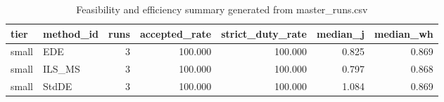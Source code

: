 \begin{table}[!t]
\centering
\caption{Feasibility and efficiency summary generated from master_runs.csv}
\label{tab:feasibility_summary_generated}
\begin{tabular}{llrrrrr}
\toprule
tier & method_id & runs & accepted_rate & strict_duty_rate & median_j & median_wh \\
\midrule
small & EDE & 3 & 100.000 & 100.000 & 0.825 & 0.869 \\
small & ILS_MS & 3 & 100.000 & 100.000 & 0.797 & 0.868 \\
small & StdDE & 3 & 100.000 & 100.000 & 1.084 & 0.869 \\
\bottomrule
\end{tabular}

\end{table}